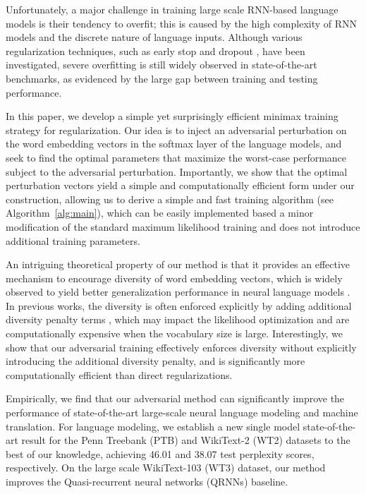 \documentclass{article}
\begin{document}
Unfortunately, a major challenge in  training large scale RNN-based language models is  their tendency to overfit; 
this is caused by the 
high complexity of RNN models 
and the discrete nature of language inputs.  
Although various regularization techniques, such as early stop and  dropout \citep[e.g.,][]{gal2016theoretically}, have been investigated, severe overfitting is still widely observed in state-of-the-art benchmarks, as evidenced by the large gap between training and testing performance. 




In this paper, we develop
a simple yet surprisingly efficient minimax training strategy for regularization.
Our idea is to inject an adversarial perturbation  
on the word embedding vectors in the softmax layer of the language models,     
and seek to find the optimal parameters that  maximize the worst-case performance subject to the adversarial perturbation.   
Importantly, we show that the optimal perturbation vectors yield a simple and computationally efficient form under our construction, allowing us to derive a simple 
and fast training algorithm (see Algorithm~\ref{alg:main}),  
which can be easily implemented based a minor modification of the standard maximum likelihood  training and does not introduce additional training parameters.  

An intriguing theoretical property of our method is that it provides an 
effective mechanism to encourage
diversity of word embedding vectors,  
which is widely observed to yield 
better generalization performance  
in neural language models \citep[e.g.,][]{
mu2017all, gao2018representation, 
liu2018learning, cogswell2015reducing, khodak2018carte}. 
In previous works, the diversity is often enforced explicitly by adding additional diversity penalty terms \citep[e.g.,][]{gao2018representation}, 
which may impact the likelihood optimization and are computationally expensive when the vocabulary size is large. 
Interestingly, we show that our adversarial training  
effectively enforces diversity without explicitly introducing the additional diversity penalty,  and is significantly more  computationally efficient than direct regularizations. 


Empirically, 
we find that our adversarial method 
can significantly improve the performance of 
state-of-the-art large-scale neural language modeling  and machine translation. 
For language modeling, 
we establish a new single model state-of-the-art result
for the Penn Treebank (PTB) and WikiText-2 (WT2) datasets to the best of our knowledge, achieving 46.01 and 38.07 test perplexity scores, respectively.  
On the large scale WikiText-103 (WT3) dataset, our method improves the Quasi-recurrent neural networks (QRNNs) \citep{merity2018analysis} 
baseline. 
\end{document}
